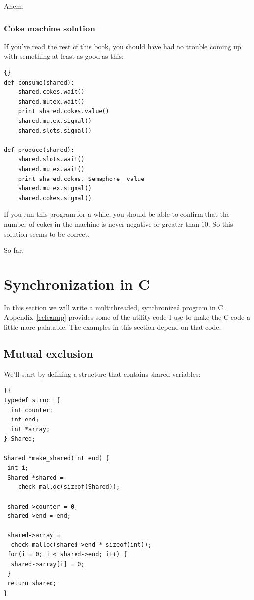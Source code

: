 \documentclass{book}
\begin{document}
Ahem.



\subsection {Coke machine solution}

If you've read the rest of this book, you should have had no
trouble coming up with something at least as good as this:

\begin{lstlisting}[title={}]{}
def consume(shared):
    shared.cokes.wait()
    shared.mutex.wait()
    print shared.cokes.value()
    shared.mutex.signal()
    shared.slots.signal()

def produce(shared):
    shared.slots.wait()
    shared.mutex.wait()
    print shared.cokes._Semaphore__value
    shared.mutex.signal()
    shared.cokes.signal()
\end{lstlisting}

If you run this program for a while, you should be able to confirm
that the number of cokes in the machine is never negative or greater
than 10.  So this solution seems to be correct.

So far.


\chapter{Synchronization in C}
\label{csync}

In this section we will write a multithreaded, synchronized
program in C.  Appendix~\ref{ccleanup} provides some of the utility
code I use to make the C code a little more palatable.  The
examples in this section depend on that code.

\section{Mutual exclusion}

We'll start by defining a structure that contains shared
variables:

\begin{lstlisting}[title={}]{}
typedef struct {
  int counter;
  int end;
  int *array;
} Shared;

Shared *make_shared(int end) {
 int i;
 Shared *shared = 
    check_malloc(sizeof(Shared));

 shared->counter = 0;
 shared->end = end;

 shared->array = 
  check_malloc(shared->end * sizeof(int));
 for(i = 0; i < shared->end; i++) {
  shared->array[i] = 0;
 }
 return shared;
}
\end{lstlisting}
\end{document}
